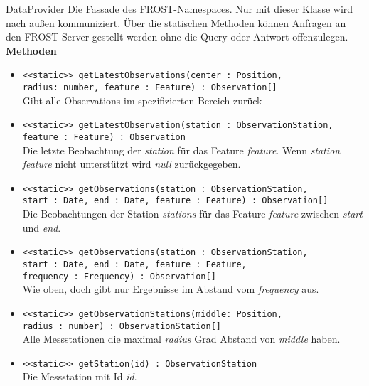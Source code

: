 \begin{Class}{DataProvider}
    Die Fassade des FROST-Namespaces. Nur mit dieser Klasse wird nach außen kommuniziert.
    Über die statischen Methoden können Anfragen an den FROST-Server gestellt werden ohne die Query oder Antwort offenzulegen.
    \textbf{Methoden}
    \begin{itemize}
        \item \texttt{<<static>> getLatestObservations(center : Position,
        \\ radius: number, feature : Feature) : Observation[]}
        \\Gibt alle Observations im spezifizierten Bereich zurück
        \item \texttt{<<static>> getLatestObservation(station : ObservationStation, feature : Feature) : Observation}
        \\ Die letzte Beobachtung der \emph{station} für das Feature \emph{feature}.
        Wenn \emph{station} \emph{feature} nicht unterstützt wird \emph{null} zurückgegeben.
        \item \texttt{<<static>> getObservations(station : ObservationStation,
        \\ start : Date, end : Date, feature : Feature) : Observation[]}
        \\ Die Beobachtungen der Station \emph{stations} für das Feature \emph{feature}
        zwischen \emph{start} und \emph{end}.
        \item \texttt{<<static>> getObservations(station : ObservationStation,
        \\ start : Date, end : Date, feature : Feature,
        \\ frequency : Frequency) : Observation[]}
        \\ Wie oben, doch gibt nur Ergebnisse im Abstand vom \emph{frequency} aus.
        \item \texttt{<<static>> getObservationStations(middle: Position,
        \\ radius : number) : ObservationStation[]}
        \\ Alle Messstationen die maximal \emph{radius} Grad Abstand von \emph{middle} haben.
        \item \texttt{<<static>> getStation(id) : ObservationStation}
        \\ Die Messstation mit Id \emph{id}.
    \end{itemize}
\end{Class}

